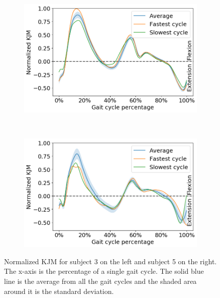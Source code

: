 \begin{figure}[ht!]
     \centering
     \begin{subfigure}[b]{0.49\textwidth}
         \centering
         \includegraphics[width=\textwidth]{img/results/moment_avg/subject03_all_set1_moment_avg_w_minmax.png}
     \end{subfigure}
     ~
     \begin{subfigure}[b]{0.49\textwidth}
         \centering
         \includegraphics[width=\textwidth]{img/results/moment_avg/subject05_all_set1_moment_avg_w_minmax.png}
     \end{subfigure}
    \caption{Normalized \ac{KJM} for subject 3 on the left and subject 5 on the right. The x-axis is the percentage of a single gait cycle. The solid blue line is the average from all the gait cycles and the shaded area around it is the standard deviation.}
    \label{fig:A-kjm-average}
\end{figure}

